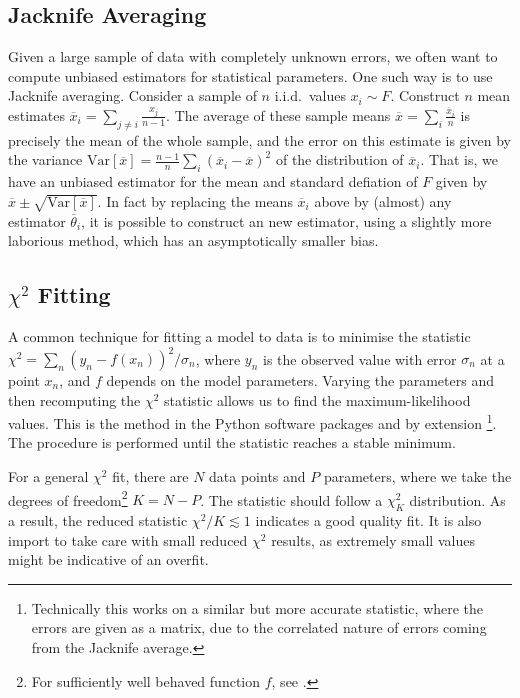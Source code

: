 \documentclass[a4paper,12pt]{article}
\begin{document}
\subsection{Jacknife Averaging}
Given a large sample of data with completely unknown errors, we often want to compute unbiased estimators for statistical parameters. One such way is to use Jacknife averaging\cite{efron1982jackknife}. Consider a sample of $n$ i.i.d.\ values $x_i \sim F$. Construct $n$ mean estimates $\overline{x}_i = \sum_{j\neq i} \frac{x_j}{n-1}$. The average of these sample means $\overline{x} = \sum_i\frac{\overline{x}_i}{n}$ is precisely the mean of the whole sample, and the error on this estimate is given by the variance $\text{Var}[\overline{x}] = \frac{n-1}{n}\sum_i{(\overline{x}_i - \overline{x})}^2$ of the distribution of $\overline{x}_i$. That is, we have an unbiased estimator for the mean and standard defiation of $F$ given by $\overline{x} \pm \sqrt{\text{Var}[\overline{x}]}$. In fact by replacing the means $\overline{x}_i$ above by (almost) any estimator $\overline{\theta}_i$, it is possible to construct an new estimator, using a slightly more laborious method, which has an asymptotically smaller bias\cite{mcintosh2016jackknife}.

\subsection{$\chi^2$ Fitting}
A common technique for fitting a model to data is to minimise the statistic $\chi^2 = \sum_n (y_n - f(x_n))^2 / \sigma_n$, where $y_n$ is the observed value with error $\sigma_n$ at a point $x_n$, and $f$ depends on the model parameters. Varying the parameters and then recomputing the $\chi^2$ statistic allows us to find the maximum-likelihood values. This is the method in the Python software packages  and by extension \cite{lepage2001constrained}\footnote{Technically this works on a similar but more accurate statistic, where the errors are given as a matrix, due to the correlated nature of errors coming from the Jacknife average.}. The procedure is performed until the statistic reaches a stable minimum.

For a general $\chi^2$ fit, there are $N$ data points and $P$ parameters, where we take the degrees of freedom\footnote{For sufficiently well behaved function $f$, see \cite{andrae2010and}.} $K=N-P$. The statistic should follow a $\chi_K^2$ distribution. As a result, the reduced statistic $\chi^2 / K \lesssim 1$ indicates a good quality fit. It is also import to take care with small reduced $\chi^2$ results, as extremely small values might be indicative of an overfit.
\end{document}
